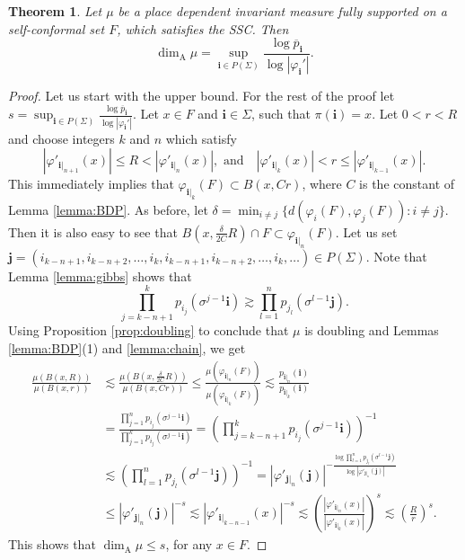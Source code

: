 \documentclass{PRM}
\theoremstyle{plain}
\newtheorem{thm}{Theorem}[section]
\theoremstyle{definition}
\theoremstyle{remark}
\begin{document}
\begin{thm}\label{thm:pw_ssc_formula}
Let $\mu$ be a place dependent invariant measure fully supported on a self-conformal set $F$, which satisfies the SSC. Then
\begin{equation*}
    \dim_{\mathrm{A}}\mu=\sup_{\mathbf{i}\in P(\Sigma)}\frac{\log \overline{p}_{\mathbf{i}}}{\log |\varphi_{\mathbf{i}}'|}.
\end{equation*}
\end{thm}
\begin{proof}
Let us start with the upper bound. For the rest of the proof let $s=\sup_{\mathbf{i}\in P(\Sigma)}\frac{\log \overline{p}_{\mathbf{i}}}{\log |\varphi_{\mathbf{i}}'|}$. Let $x\in F$ and $\mathbf{i}\in\Sigma$, such that $\pi(\mathbf{i})=x$. Let $0<r<R$ and choose integers $k$ and $n$ which satisfy
\begin{equation*}
    |\varphi'_{\mathbf{i}|_{n+1}}(x)|\leq R < |\varphi'_{\mathbf{i}|_{n}}(x)|,\text{ and} \quad |\varphi'_{\mathbf{i}|_{k}}(x)|< r \leq |\varphi'_{\mathbf{i}|_{k-1}}(x)|.
\end{equation*}
This immediately implies that $\varphi_{\mathbf{i}|_k}(F)\subset B(x,Cr)$, where $C$ is the constant of Lemma \ref{lemma:BDP}. As before, let $\delta = \min_{i\ne j}\{d(\varphi_i(F),\varphi_j(F))\colon i\ne j\}$. Then it is also easy to see that $B(x,\frac{\delta}{2C}R)\cap F\subset \varphi_{\mathbf{i}|_n}(F)$. Let us set $\mathbf{j}=(i_{k-n+1},i_{k-n+2},\ldots,i_k,i_{k-n+1},i_{k-n+2},\ldots,i_k,\ldots)\in P(\Sigma)$. Note that Lemma \ref{lemma:gibbs} shows that
\begin{equation*}
    \prod_{j=k-n+1}^kp_{i_j}(\sigma^{j-1}\mathbf{i})\gtrsim \prod_{l=1}^np_{j_l}(\sigma^{l-1}\mathbf{j}).
\end{equation*}
Using Proposition \ref{prop:doubling} to conclude that $\mu$ is doubling and Lemmas \ref{lemma:BDP}(1) and \ref{lemma:chain}, we get
\begin{align*}
    \frac{\mu(B(x,R))}{\mu(B(x,r))}&\lesssim \frac{\mu(B(x,\frac{\delta}{2C}R))}{\mu(B(x,Cr))}\leq \frac{\mu(\varphi_{\mathbf{i}|_n}(F))}{\mu(\varphi_{\mathbf{i}|_k}(F))}\lesssim \frac{p_{\mathbf{i}|_n}(\mathbf{i})}{p_{\mathbf{i}|_k}(\mathbf{i})}\\
    &=\frac{\prod_{j=1}^np_{i_j}(\sigma^{j-1}\mathbf{i})}{\prod_{j=1}^kp_{i_j}(\sigma^{j-1}\mathbf{i})} =\left(\prod_{j=k-n+1}^kp_{i_j}(\sigma^{j-1}\mathbf{i})\right)^{-1}\\
    &\lesssim\left(\prod_{l=1}^np_{j_l}(\sigma^{l-1}\mathbf{j})\right)^{-1}= |\varphi'_{\mathbf{j}|_n}(\mathbf{j})|^{-\frac{\log \prod_{l=1}^np_{j_l}(\sigma^{l-1}\mathbf{j})}{\log |\varphi'_{\mathbf{j}|_n}(\mathbf{j})|}}\\
    &\leq|\varphi'_{\mathbf{j}|_n}(\mathbf{j})|^{-s}\lesssim  |\varphi'_{\mathbf{i}|_{k-n-1}}(x)|^{-s}\lesssim\left(\frac{|\varphi'_{\mathbf{i}|_{n}}(x)|}{|\varphi'_{\mathbf{i}|_{k}}(x)|}\right)^s\lesssim\left(\frac{R}{r}\right)^s.
\end{align*}
This shows that $\dim_{\mathrm{A}}\mu\leq s$, for any $x\in F$.


\end{proof}
\end{document}
